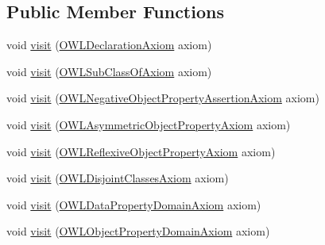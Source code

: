 \subsection*{Public Member Functions}
\begin{DoxyCompactItemize}
\item 
void \hyperlink{interfaceorg_1_1semanticweb_1_1owlapi_1_1model_1_1_o_w_l_axiom_visitor_ad9a3216fb046104fa07abdb0d186fcca}{visit} (\hyperlink{interfaceorg_1_1semanticweb_1_1owlapi_1_1model_1_1_o_w_l_declaration_axiom}{O\-W\-L\-Declaration\-Axiom} axiom)
\item 
void \hyperlink{interfaceorg_1_1semanticweb_1_1owlapi_1_1model_1_1_o_w_l_axiom_visitor_a5e9f240b97ad056ae124c7301fc961c5}{visit} (\hyperlink{interfaceorg_1_1semanticweb_1_1owlapi_1_1model_1_1_o_w_l_sub_class_of_axiom}{O\-W\-L\-Sub\-Class\-Of\-Axiom} axiom)
\item 
void \hyperlink{interfaceorg_1_1semanticweb_1_1owlapi_1_1model_1_1_o_w_l_axiom_visitor_a11ab1bcc3d7f7737cb5ed6735621a91a}{visit} (\hyperlink{interfaceorg_1_1semanticweb_1_1owlapi_1_1model_1_1_o_w_l_negative_object_property_assertion_axiom}{O\-W\-L\-Negative\-Object\-Property\-Assertion\-Axiom} axiom)
\item 
void \hyperlink{interfaceorg_1_1semanticweb_1_1owlapi_1_1model_1_1_o_w_l_axiom_visitor_a9cc0438c4815dd46e726e425249d7962}{visit} (\hyperlink{interfaceorg_1_1semanticweb_1_1owlapi_1_1model_1_1_o_w_l_asymmetric_object_property_axiom}{O\-W\-L\-Asymmetric\-Object\-Property\-Axiom} axiom)
\item 
void \hyperlink{interfaceorg_1_1semanticweb_1_1owlapi_1_1model_1_1_o_w_l_axiom_visitor_aa75b9e8b9b09e9e1e02d6bd4e21a78af}{visit} (\hyperlink{interfaceorg_1_1semanticweb_1_1owlapi_1_1model_1_1_o_w_l_reflexive_object_property_axiom}{O\-W\-L\-Reflexive\-Object\-Property\-Axiom} axiom)
\item 
void \hyperlink{interfaceorg_1_1semanticweb_1_1owlapi_1_1model_1_1_o_w_l_axiom_visitor_a8ea2a73b77995165e6ef105aa71b573d}{visit} (\hyperlink{interfaceorg_1_1semanticweb_1_1owlapi_1_1model_1_1_o_w_l_disjoint_classes_axiom}{O\-W\-L\-Disjoint\-Classes\-Axiom} axiom)
\item 
void \hyperlink{interfaceorg_1_1semanticweb_1_1owlapi_1_1model_1_1_o_w_l_axiom_visitor_aa2bf6b05653cd7b34d55059a9bce92e6}{visit} (\hyperlink{interfaceorg_1_1semanticweb_1_1owlapi_1_1model_1_1_o_w_l_data_property_domain_axiom}{O\-W\-L\-Data\-Property\-Domain\-Axiom} axiom)
\item 
void \hyperlink{interfaceorg_1_1semanticweb_1_1owlapi_1_1model_1_1_o_w_l_axiom_visitor_a5282829e5e310d8fc80c84f0942bbe1a}{visit} (\hyperlink{interfaceorg_1_1semanticweb_1_1owlapi_1_1model_1_1_o_w_l_object_property_domain_axiom}{O\-W\-L\-Object\-Property\-Domain\-Axiom} axiom)

\end{DoxyCompactItemize}

